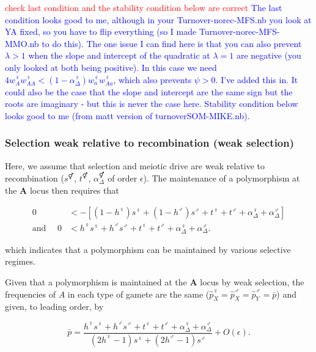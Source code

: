 \documentclass[12pt]{article}
\begin{document}
\textcolor{red}{check last condition and the stability condition below are correct}
\textcolor{blue}{The last condition looks good to me, although in your Turnover-norec-MFS.nb you look at YA fixed, so you have to flip everything (so I made Turnover-norec-MFS-MMO.nb to do this).
The one issue I can find here is that you can also prevent $\lambda>1$ when the slope and intercept of the quadratic at $\lambda=1$ are negative (you only looked at both being positive). In this case we need $4w_{A}^{\female}w_{AA}^{\female}<(1-\alpha_\Delta^{\female})w_{a}^{\female}w_{Aa}^{\female}$, which also prevents $\psi>0$.
I've added this in.
It could also be the case that the slope and intercept are the same sign but the roots are imaginary - but this is never the case here.
Stability condition below looks good to me (from matt version of turnoverSOM-MIKE.nb).}

\subsubsection*{Selection weak relative to recombination (weak selection)}

Here, we assume that selection and meiotic drive are weak relative to recombination ($s^\Hermaphrodite$, $t^\Hermaphrodite$, $\alpha_{\Delta}^\Hermaphrodite$ of order $\epsilon$). 
The maintenance of a polymorphism at the \textbf{A} locus then requires that

\begin{equation}
\begin{split}
0&< - \left[(1-h^\female)s^\female +(1-h^\male) s^\male + t^\female +t^\male + \alpha_{\Delta}^\female+\alpha_{\Delta}^\male\right]\\
%
\text{and }\quad 0&<h^\female s^\female +h^\male s^\male + t^\female +t^\male + \alpha_{\Delta}^\female+\alpha_{\Delta}^\male.
\end{split}
\end{equation}

\noindent
which indicates that a polymorphism can be maintained by various selective regimes. 

Given that a polymorphism is maintained at the \textbf{A} locus by weak selection, the frequencies of $A$ in each type of gamete are the same ($\hat{p}^\female_X=\hat{p}^\male_X=\hat{p}^\male_Y=\bar{p}$) and given, to leading order, by 

\begin{equation}
\bar{p}=\frac{h^\female s^\female + h^\male s^\male +t^\female+t^\male+\alpha_{\Delta}^\female+\alpha_{\Delta}^\male}
{(2h^\female-1)s^\female+(2h^\male-1)s^\male}
+O(\epsilon)
.
\label{eq:pAve}
\end{equation}
\end{document}

